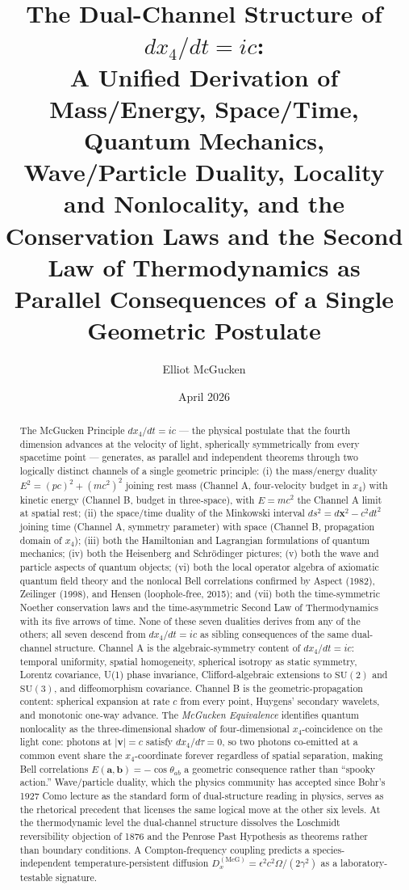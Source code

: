 \documentclass[11pt,a4paper]{article}
\title{The Dual-Channel Structure of $dx_4/dt = ic$:\\
A Unified Derivation of Mass/Energy, Space/Time, Quantum Mechanics, Wave/Particle Duality, Locality and Nonlocality, and the Conservation Laws and the Second Law of Thermodynamics as Parallel Consequences of a Single Geometric Postulate}
\author{Elliot McGucken}
\affil{Light Time Dimension Theory\\\texttt{elliotmcguckenphysics.com}}
\date{April 2026}
\begin{document}
\maketitle

\begin{abstract}
The McGucken Principle $dx_4/dt = ic$ --- the physical postulate that the fourth dimension advances at the velocity of light, spherically symmetrically from every spacetime point --- generates, as parallel and independent theorems through two logically distinct channels of a single geometric principle: (i) the mass/energy duality $E^2 = (pc)^2 + (mc^2)^2$ joining rest mass (Channel A, four-velocity budget in $x_4$) with kinetic energy (Channel B, budget in three-space), with $E = mc^2$ the Channel A limit at spatial rest; (ii) the space/time duality of the Minkowski interval $ds^2 = d\mathbf{x}^2 - c^2 dt^2$ joining time (Channel A, symmetry parameter) with space (Channel B, propagation domain of $x_4$); (iii) both the Hamiltonian and Lagrangian formulations of quantum mechanics; (iv) both the Heisenberg and Schr\"odinger pictures; (v) both the wave and particle aspects of quantum objects; (vi) both the local operator algebra of axiomatic quantum field theory and the nonlocal Bell correlations confirmed by Aspect (1982), Zeilinger (1998), and Hensen (loophole-free, 2015); and (vii) both the time-symmetric Noether conservation laws and the time-asymmetric Second Law of Thermodynamics with its five arrows of time. None of these seven dualities derives from any of the others; all seven descend from $dx_4/dt = ic$ as sibling consequences of the same dual-channel structure. Channel A is the algebraic-symmetry content of $dx_4/dt = ic$: temporal uniformity, spatial homogeneity, spherical isotropy as static symmetry, Lorentz covariance, U(1) phase invariance, Clifford-algebraic extensions to $\mathrm{SU}(2)$ and $\mathrm{SU}(3)$, and diffeomorphism covariance. Channel B is the geometric-propagation content: spherical expansion at rate $c$ from every point, Huygens' secondary wavelets, and monotonic one-way advance. The \emph{McGucken Equivalence} identifies quantum nonlocality as the three-dimensional shadow of four-dimensional $x_4$-coincidence on the light cone: photons at $|\mathbf{v}| = c$ satisfy $dx_4/d\tau = 0$, so two photons co-emitted at a common event share the $x_4$-coordinate forever regardless of spatial separation, making Bell correlations $E(\mathbf{a}, \mathbf{b}) = -\cos\theta_{ab}$ a geometric consequence rather than ``spooky action.'' Wave/particle duality, which the physics community has accepted since Bohr's 1927 Como lecture as the standard form of dual-structure reading in physics, serves as the rhetorical precedent that licenses the same logical move at the other six levels. At the thermodynamic level the dual-channel structure dissolves the Loschmidt reversibility objection of 1876 and the Penrose Past Hypothesis as theorems rather than boundary conditions. A Compton-frequency coupling predicts a species-independent temperature-persistent diffusion $D_x^{(\text{McG})} = \epsilon^2 c^2 \Omega / (2\gamma^2)$ as a laboratory-testable signature.
\end{abstract}
\end{document}
